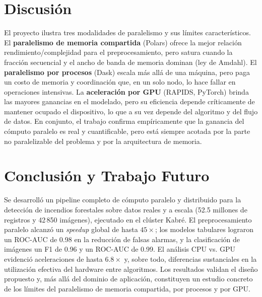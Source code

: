 \documentclass[conference]{IEEEtran}
\begin{document}
\section{Discusión}
\label{sec:discusion}
El proyecto ilustra tres modalidades de paralelismo y sus límites característicos. El \textbf{paralelismo de memoria compartida} (Polars) ofrece la mejor relación rendimiento/complejidad para el preprocesamiento, pero satura cuando la fracción secuencial y el ancho de banda de memoria dominan (ley de Amdahl). El \textbf{paralelismo por procesos} (Dask) escala más allá de una máquina, pero paga un costo de memoria y coordinación que, en un solo nodo, lo hace fallar en operaciones intensivas. La \textbf{aceleración por GPU} (RAPIDS, PyTorch) brinda las mayores ganancias en el modelado, pero su eficiencia depende críticamente de mantener ocupado el dispositivo, lo que a su vez depende del algoritmo y del flujo de datos. En conjunto, el trabajo confirma empíricamente que la ganancia del cómputo paralelo es real y cuantificable, pero está siempre acotada por la parte no paralelizable del problema y por la arquitectura de memoria.

\section{Conclusión y Trabajo Futuro}
\label{sec:conclusion}
Se desarrolló un pipeline completo de cómputo paralelo y distribuido para la detección de incendios forestales sobre datos reales y a escala (52.5 millones de registros y 42\,850 imágenes), ejecutado en el clúster Kabré. El preprocesamiento paralelo alcanzó un \textit{speedup} global de hasta $45\times$; los modelos tabulares lograron un ROC-AUC de 0.98 en la reducción de falsas alarmas, y la clasificación de imágenes un F1 de 0.96 y un ROC-AUC de 0.99. El análisis CPU vs. GPU evidenció aceleraciones de hasta $6.8\times$ y, sobre todo, diferencias sustanciales en la utilización efectiva del hardware entre algoritmos. Los resultados validan el diseño propuesto y, más allá del dominio de aplicación, constituyen un estudio concreto de los límites del paralelismo de memoria compartida, por procesos y por GPU.
\end{document}
